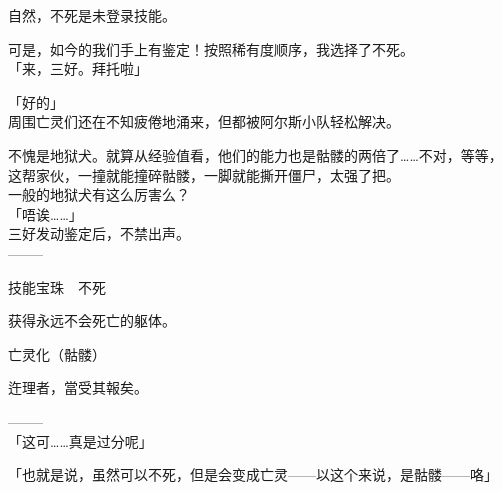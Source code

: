 自然，不死是未登录技能。

可是，如今的我们手上有鉴定！按照稀有度顺序，我选择了不死。\\

「来，三好。拜托啦」

「好的」\\

周围亡灵们还在不知疲倦地涌来，但都被阿尔斯小队轻松解决。

不愧是地狱犬。就算从经验值看，他们的能力也是骷髅的两倍了……不对，等等，这帮家伙，一撞就能撞碎骷髅，一脚就能撕开僵尸，太强了把。\\

一般的地狱犬有这么厉害么？\\

「唔诶……」\\

三好发动鉴定后，不禁出声。\\

  --------

  技能宝珠　不死

%  


  获得永远不会死亡的躯体。

  亡灵化（骷髅）

%  
 

 迕理者，當受其報矣。

  --------\\

「这可……真是过分呢」

「也就是说，虽然可以不死，但是会变成亡灵——以这个来说，是骷髅——咯」

